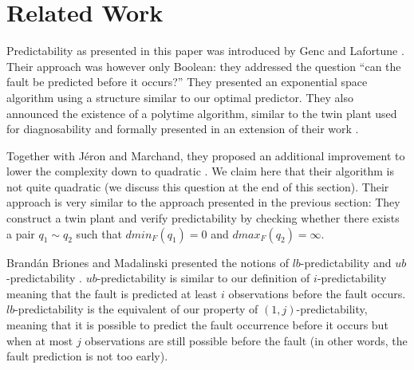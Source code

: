 \documentclass{article}
\newcommand{\dmin}[1]{\mathit{dmin}_{#1}}
\newcommand{\dmax}[1]{\mathit{dmax}_{#1}}
\begin{document}
\section{Related Work}
\label{sec::related}
Predictability as presented in this paper 
was introduced by Genc and Lafortune 
\cite{genc-lafortune::safeprocess::06}.  
Their approach was however only Boolean: 
they addressed the question 
``can the fault be predicted before it occurs?''  
They presented an exponential space algorithm 
using a structure similar to our optimal predictor.  
They also announced the existence of a polytime algorithm, 
similar to the twin plant used for diagnosability 
and formally presented in an extension of their work 
\cite{genc-lafortune::automatica::09}.  

Together with J\'eron and Marchand, 
they proposed an additional improvement to lower the complexity 
down to quadratic \cite{jeron-etal::wc::08}.  
We claim here that their algorithm is not quite quadratic 
(we discuss this question at the end of this section).  
Their approach is very similar to the approach presented 
in the previous section: 
They construct a twin plant and verify predictability 
by checking whether there exists a pair $q_1\sim q_2$ 
such that $\dmin{F}(q_1) = 0$ and $\dmax{F}(q_2) = \infty$.  

Brand\'an Briones and Madalinski presented 
the notions of $lb$-predictability and $ub$-predictability 
\cite{brandanbriones-madalinski::sccc::11}.  
$ub$-predictability is similar to our definition of $i$-predictability 
meaning that the fault is predicted at least $i$ observations 
before the fault occurs.  
$lb$-predictability is the equivalent 
of our property of $(1,j)$-predictability, 
meaning that it is possible to predict the fault occurrence 
before it occurs but when at most $j$ observations 
are still possible before the fault 
(in other words, the fault prediction is not too early).  
\end{document}
